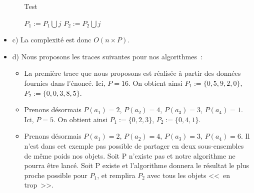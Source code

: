 \begin{itemize}
\begin{itemize}
\begin{algorithm}[t]
\caption{Test}
\label{algoexo7test}
\begin{algorithmic}[1]
\STATE $P_1 := P_1 \bigcup j$
\ELSE
\STATE $P_2 := P_2 \bigcup j$
\ENDIF
\ENDFOR
\end{algorithmic}
\end{algorithm}
\end{itemize}

\item c) La complexité est donc $O(n\times P)$.
\item d) Nous proposons les traces suivantes pour nos algorithmes~:
\begin{itemize}
\item La première trace que nous proposons est réalisée à partir des
  données fournies dans l'énoncé. Ici, $P=16$. On obtient ainsi $P_1 := \{ 0, 5, 9,
  2, 0\}$, $P_2 := \{ 0, 0, 3, 8, 5\}$.
\item Prenons désormais $P(a_1)=2$, $P(a_2)=4$, $P(a_3)=3$,
  $P(a_4)=1$. Ici, $P=5$. On obtient ainsi  $P_1 := \{ 0, 2, 3\}$,
  $P_2 := \{ 0, 4, 1\}$.
\item Prenons désormais $P(a_1)=2$, $P(a_2)=4$, $P(a_3)=3$,
  $P(a_4)=6$. Il n'est dans cet exemple pas possible de partager en
  deux sous-ensembles de même poids nos objets. Soit P n'existe pas et
  notre algorithme ne pourra être lancé. Soit P existe et l'algorithme
  donnera le résultat le plus proche possible pour $P_1$, et remplira
  $P_2$ avec tous les objets <<~en trop~>>.
\end{itemize}
\end{itemize}

